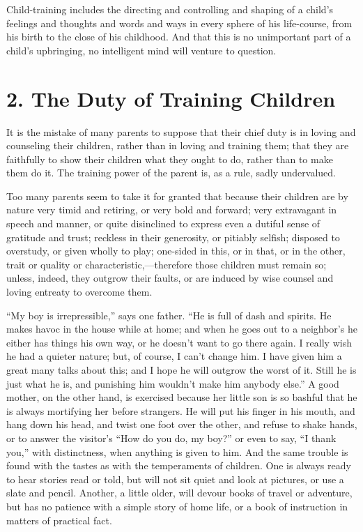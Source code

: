 \documentclass[
]{book}
\begin{document}
Child-training includes the directing and controlling and shaping of a child's feelings and thoughts and words and ways in every sphere of his life-course, from his birth to the close of his childhood. And that this is no unimportant part of a child's upbringing, no intelligent mind will venture to question.

\hypertarget{the-duty-of-training-children}{%
\chapter{2. The Duty of Training Children}\label{the-duty-of-training-children}}

It is the mistake of many parents to suppose that their chief duty is in loving and counseling their children, rather than in loving and training them; that they are faithfully to show their children what they ought to do, rather than to make them do it. The training power of the parent is, as a rule, sadly undervalued.

Too many parents seem to take it for granted that because their children are by nature very timid and retiring, or very bold and forward; very extravagant in speech and manner, or quite disinclined to express even a dutiful sense of gratitude and trust; reckless in their generosity, or pitiably selfish; disposed to overstudy, or given wholly to play; one-sided in this, or in that, or in the other, trait or quality or characteristic,---therefore those children must remain so; unless, indeed, they outgrow their faults, or are induced by wise counsel and loving entreaty to overcome them.

``My boy is irrepressible,'' says one father. ``He is full of dash and spirits. He makes havoc in the house while at home; and when he goes out to a neighbor's he either has things his own way, or he doesn't want to go there again. I really wish he had a quieter nature; but, of course, I can't change him. I have given him a great many talks about this; and I hope he will outgrow the worst of it. Still he is just what he is, and punishing him wouldn't make him anybody else.'' A good mother, on the other hand, is exercised because her little son is so bashful that he is always mortifying her before strangers. He will put his finger in his mouth, and hang down his head, and twist one foot over the other, and refuse to shake hands, or to answer the visitor's ``How do you do, my boy?'' or even to say, ``I thank you,'' with distinctness, when anything is given to him. And the same trouble is found with the tastes as with the temperaments of children. One is always ready to hear stories read or told, but will not sit quiet and look at pictures, or use a slate and pencil. Another, a little older, will devour books of travel or adventure, but has no patience with a simple story of home life, or a book of instruction in matters of practical fact.
\end{document}

